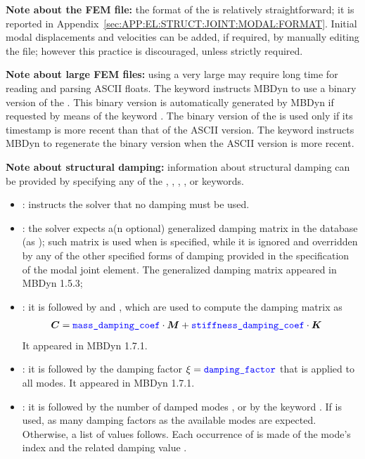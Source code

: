 \textbf{Note about the FEM file:}
the format of the  is relatively straightforward;
it is reported
in Appendix~\ref{sec:APP:EL:STRUCT:JOINT:MODAL:FORMAT}.
Initial modal displacements and velocities can be added,
if required, by manually editing the file; however this practice
is discouraged, unless strictly required.


\textbf{Note about large FEM files:}
using a very large  may require long time for
reading and parsing ASCII floats.
The keyword  instructs MBDyn to use a binary version
of the .
This binary version is automatically generated by MBDyn if requested
by means of the keyword .
The binary version of the  is used only if its
timestamp is more recent than that of the ASCII version.
The keyword  instructs MBDyn to regenerate the
binary version when the ASCII version is more recent.

\textbf{Note about structural damping:}
information about structural damping can be provided by specifying any of the
, , ,
, or  keywords.
\begin{itemize}
\item
{}:
instructs the solver that no damping must be used.

\item
{}:
the solver expects a(n optional) generalized damping matrix in the database
(as );
such matrix is used when  is specified,
while it is ignored and overridden by any of the other specified forms
of damping provided in the specification of the modal joint element.
The generalized damping matrix appeared in MBDyn 1.5.3;

\item
{}:
it is followed by
 and ,
which are used to compute the damping matrix as
\begin{align}
	\boldsymbol{C} &= \textcolor{blue}{\texttt{mass\_damping\_coef}} \cdot \boldsymbol{M} + \textcolor{blue}{\texttt{stiffness\_damping\_coef}} \cdot \boldsymbol{K}
\end{align}
It appeared in MBDyn 1.7.1.

\item
{}:
it is followed by the damping factor $\xi = \textcolor{blue}{\texttt{damping\_factor}}$
that is applied to all modes.
It appeared in MBDyn 1.7.1.

\item
{}:
it is followed by the number of damped modes ,
or by the keyword .
If  is used, as many damping factors as the available modes
are expected.
Otherwise, a list of  values follows.
Each occurrence of  is made of the mode's index 
and the related damping value .
\end{itemize}

